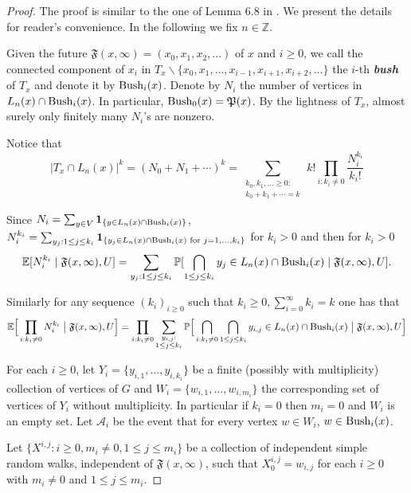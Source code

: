 \documentclass[12pt]{article}
\numberwithin{equation}{section}
\newcommand{\be}{\begin{equation}}
\newcommand{\ee}{\end{equation}}
\newcommand{\1}{\mathbf{1}}
\newcommand{\notion}[1]{{\bf  \textit{#1}}}
\begin{document}
 \begin{proof}
 	The proof is similar to the one of Lemma 6.8 in \cite{Hutchcroft2018a}. We present the details for reader's convenience. In the following we fix $n\in\mathbb{Z}$.
 	
 	Given the future $\mathfrak{F}(x,\infty)=(x_0,x_1,x_2,\ldots)$ of $x$ and $i\geq0$, we call the connected component of $x_i$ in $T_x\backslash\{x_0,x_1,\ldots,x_{i-1},x_{i+1},x_{i+2},\ldots\}$ the $i$-th \notion{bush} of $T_x$ and denote it by $\textnormal{Bush}_i(x)$. 
 	Denote by $N_i$ the number of vertices in $L_n(x)\cap \textnormal{Bush}_i(x)$. In particular, $\textnormal{Bush}_0(x)=\mathfrak{P}(x)$.  By the lightness of $T_x$, almost surely only finitely many $N_i$'s are nonzero. 
 	
 	Notice that 
 	\be\label{eq: lem4.15-1}
 	|T_x\cap L_n(x)|^k=(N_0+N_1+\cdots)^k=\sum_{\substack{k_0,k_1,\ldots \geq 0:\\ k_0+ k_1+\cdots  =k}} \,k!\prod_{i:k_i\neq 0} \frac{N_i^{k_i}}{k_i!}
 	\ee
 	
 	Since $N_i=\sum_{y\in V}\mathbf{1}_{ \{ y\in L_n(x)\cap \textnormal{Bush}_i(x) \} }$, 
 	$N_i^{k_i}=\sum_{y_j: 1\leq j\leq k_i}\mathbf{1}_{ \{y_j\in L_n(x)\cap \textnormal{Bush}_i(x) \textnormal{ for }j=1,\ldots,k_i  \} }$ for $k_i>0$ and then for $k_i>0$
 	\[
 	\mathbb{E}[N_i^{k_i}\mid \mathfrak{F}(x,\infty),U]=\sum_{y_j: 1\leq j\leq k_i}\mathbb{P}[\bigcap_{1\leq j\leq k_i} y_j\in L_n(x)\cap \textnormal{Bush}_i(x) \mid \mathfrak{F}(x,\infty),U ]. 
 	\]
 
 Similarly for any  sequence $(k_i)_{i\geq0}$ such that $k_i\geq 0,\sum_{i=0}^{\infty}k_i=k$ one has that 
 	\be\label{eq: lem4.15-2}
 	\mathbb{E}\Big[\prod_{i:k_i\neq 0}N_i^{k_i}\bigm|\mathfrak{F}(x,\infty),U\Big]
 	=\prod_{i:k_i\neq 0} \sum_{\substack{y_{i,j}:\\ 1\leq j\leq k_i}}\mathbb{P}\Big[\bigcap_{i:k_i\neq0}\bigcap_{1\leq j\leq k_i} y_{i,j}\in L_n(x)\cap \textnormal{Bush}_i(x)\bigm|\mathfrak{F}(x,\infty),U\Big]
 	\ee
 	
 	For each $i\geq0$, let $Y_i=\{y_{i,1},\ldots,y_{i,k_i}\}$ be a finite (possibly with multiplicity) collection of vertices of $G$ and $W_i=\{w_{i,1},\ldots,w_{i,m_i} \}$ the corresponding set of vertices of $Y_i$ without multiplicity. In particular if $k_i=0$ then $m_i=0$ and $W_i$ is an empty set. Let $\mathscr{A}_i$ be the event that for every vertex $w\in W_i$, $w\in \textnormal{Bush}_i(x)$. 
 	
 	Let $\{X^{i,j}:i\geq0,m_i\neq 0,1\leq j\leq m_i \}$ be a collection of independent simple random walks, independent of $\mathfrak{F}(x,\infty)$, such that $X_0^{i,j}=w_{i,j}$ for each 
 	$i\geq0$ with $m_i\neq0$ and $1\leq j\leq m_i$. 
 	

\end{proof}
\end{document}
